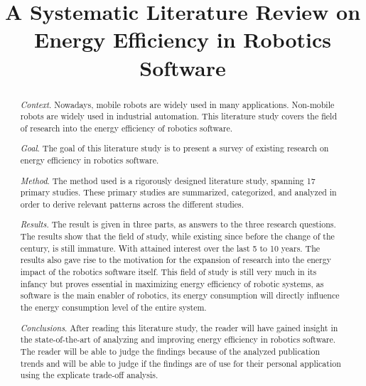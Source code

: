 \documentclass[10pt, conference, compsocconf]{IEEEtran}
\begin{document}
\title{
	{A Systematic Literature Review on Energy Efficiency in Robotics Software}
}

\author{

\vspace{5mm}

}


\maketitle

\begin{abstract}
\noindent \textit{Context}. 
Nowadays, mobile robots are widely used in many applications. Non-mobile robots are widely used in industrial automation.
This literature study covers the field of research into the energy efficiency of robotics software.

\noindent \textit{Goal}. 
The goal of this literature study is to present a survey of existing research on energy efficiency in robotics software.

\noindent \textit{Method}. 
The method used is a rigorously designed literature study, spanning 17 primary studies. 
These primary studies are summarized, categorized, and analyzed in order to derive relevant patterns across the different studies.

\noindent \textit{Results}. 
The result is given in three parts, as answers to the three research questions. 
The results show that the field of study, while existing since before the change of the century, is still immature.
With attained interest over the last 5 to 10 years.
The results also gave rise to the motivation for the expansion of research into the energy impact of the robotics software itself.
This field of study is still very much in its infancy but proves essential in maximizing energy efficiency of robotic systems, 
as software is the main enabler of robotics, its energy consumption will directly inﬂuence the energy consumption level of the
entire system.

\noindent \textit{Conclusions}.
After reading this literature study, the reader will have gained insight in the state-of-the-art of analyzing and 
improving energy efficiency in robotics software. The reader will be able to judge the findings because of the analyzed publication trends
and will be able to judge if the findings are of use for their personal application using the explicate trade-off analysis.
\end{abstract}
\end{document}
